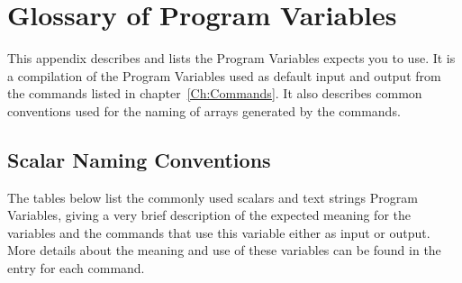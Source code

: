 \section{Glossary of Program Variables} \label{App:Glossary}

This appendix describes and lists the Program Variables {\ifeffit} 
expects you to use.  It is a compilation of the Program Variables used as
default input and output from the commands listed in
chapter~{\ref{Ch:Commands}}.  It also describes common conventions used for
the naming of arrays generated by the commands.

\subsection{Scalar Naming Conventions}\label{App:Glossary:scalars}

The tables below list the commonly used scalars and text strings
Program Variables, giving a very brief description of the expected
meaning for the variables and the commands that use this variable
either as input or output.  More details about the meaning and use of
these variables can be found in the entry for each command.

